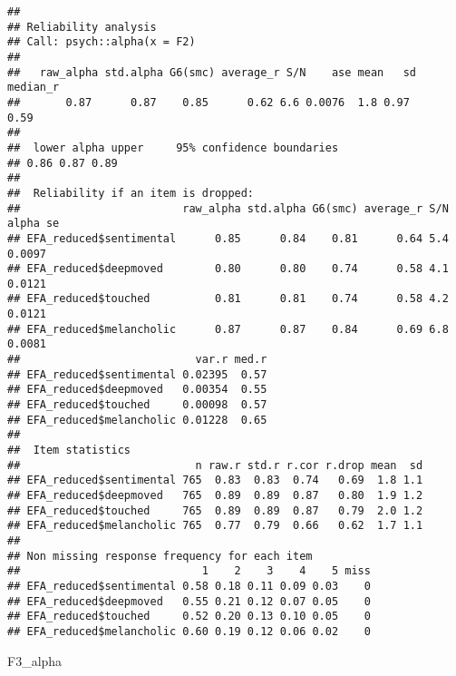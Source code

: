 \documentclass[
]{article}
\newenvironment{Shaded}{\begin{snugshade}}{\end{snugshade}}
\newcommand{\NormalTok}[1]{#1}
\begin{document}
\begin{verbatim}
## 
## Reliability analysis   
## Call: psych::alpha(x = F2)
## 
##   raw_alpha std.alpha G6(smc) average_r S/N    ase mean   sd median_r
##       0.87      0.87    0.85      0.62 6.6 0.0076  1.8 0.97     0.59
## 
##  lower alpha upper     95% confidence boundaries
## 0.86 0.87 0.89 
## 
##  Reliability if an item is dropped:
##                         raw_alpha std.alpha G6(smc) average_r S/N alpha se
## EFA_reduced$sentimental      0.85      0.84    0.81      0.64 5.4   0.0097
## EFA_reduced$deepmoved        0.80      0.80    0.74      0.58 4.1   0.0121
## EFA_reduced$touched          0.81      0.81    0.74      0.58 4.2   0.0121
## EFA_reduced$melancholic      0.87      0.87    0.84      0.69 6.8   0.0081
##                           var.r med.r
## EFA_reduced$sentimental 0.02395  0.57
## EFA_reduced$deepmoved   0.00354  0.55
## EFA_reduced$touched     0.00098  0.57
## EFA_reduced$melancholic 0.01228  0.65
## 
##  Item statistics 
##                           n raw.r std.r r.cor r.drop mean  sd
## EFA_reduced$sentimental 765  0.83  0.83  0.74   0.69  1.8 1.1
## EFA_reduced$deepmoved   765  0.89  0.89  0.87   0.80  1.9 1.2
## EFA_reduced$touched     765  0.89  0.89  0.87   0.79  2.0 1.2
## EFA_reduced$melancholic 765  0.77  0.79  0.66   0.62  1.7 1.1
## 
## Non missing response frequency for each item
##                            1    2    3    4    5 miss
## EFA_reduced$sentimental 0.58 0.18 0.11 0.09 0.03    0
## EFA_reduced$deepmoved   0.55 0.21 0.12 0.07 0.05    0
## EFA_reduced$touched     0.52 0.20 0.13 0.10 0.05    0
## EFA_reduced$melancholic 0.60 0.19 0.12 0.06 0.02    0
\end{verbatim}

\begin{Shaded}
\begin{Highlighting}[]
\NormalTok{F3\_alpha}
\end{Highlighting}
\end{Shaded}
\end{document}
